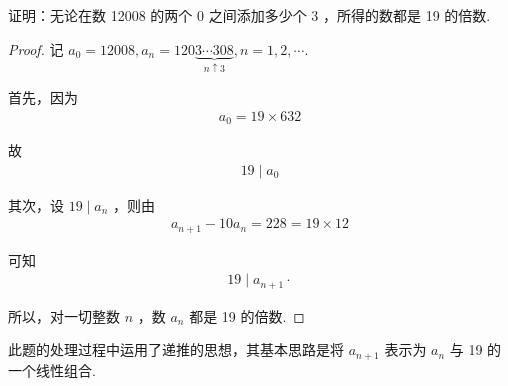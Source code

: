 \begin{example}
证明：无论在数 12008 的两个 0 之间添加多少个 3 ，所得的数都是 19 的倍数. 
\end{example}
\begin{proof}
记 $a_{0}=12008, a_{n}=120 \underbrace{3 \cdots 308}_{n \uparrow 3}, n=1,2, \cdots$.

首先，因为
\begin{align*}
a_{0}=19 \times 632
\end{align*}

故
\begin{align*}
19 \mid a_{0}
\end{align*}

其次，设 $19 \mid a_{n}$ ，则由
\begin{align*}
a_{n+1}-10 a_{n}=228=19 \times 12
\end{align*}

可知
\begin{align*}
19 \mid a_{n+1} \cdot
\end{align*}

所以，对一切整数 $n$ ，数 $a_{n}$ 都是 19 的倍数.
\end{proof}
\begin{note}
此题的处理过程中运用了递推的思想，其基本思路是将 $a_{n+1}$ 表示为 $a_{n}$ 与 19 的一个线性组合. 
\end{note}

